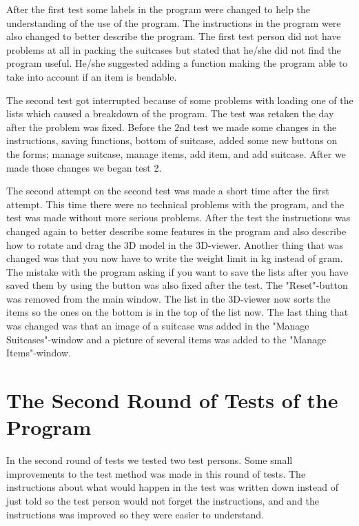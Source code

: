 After the first test some labels in the program were changed to help the understanding of the use of the program. The instructions in the program were also changed to better describe the program. The first test person did not have problems at all in packing the suitcases but stated that he/she did not find the program useful. He/she suggested adding a function making the program able to take into account if an item is bendable.

The second test got interrupted because of some problems with loading one of the lists which caused a breakdown of the program. The test was retaken the day after the problem was fixed. Before the 2nd test we made some changes in the instructions, saving functions, bottom of suitcase, added some new buttons on the forms; manage suitcase, manage items, add item, and add suitcase. After we made those changes we began test 2.

The second attempt on the second test was made a short time after the first attempt. This time there were no technical problems with the program, and the test was made without more serious problems. After the test the instructions was changed again to better describe some features in the program and also describe how to rotate and drag the 3D model in the 3D-viewer. Another thing that was changed was that you now have to write the weight limit in kg instead of gram. The mistake with the program asking if you want to save the lists after you have saved them by using the button was also fixed after the test. The "Reset"-button was removed from the main window. The list in the 3D-viewer now sorts the items so the ones on the bottom is in the top of the list now. The last thing that was changed was that an image of a suitcase was added in the "Manage Suitcases"-window and a picture of several items was added to the "Manage Items"-window.

\section{The Second Round of Tests of the Program}
In the second round of tests we tested two test persons. Some small improvements to the test method was made in this round of tests. The instructions about what would happen in the test was written down instead of just told so the test person would not forget the instructions, and and the instructions was improved so they were easier to understand.

